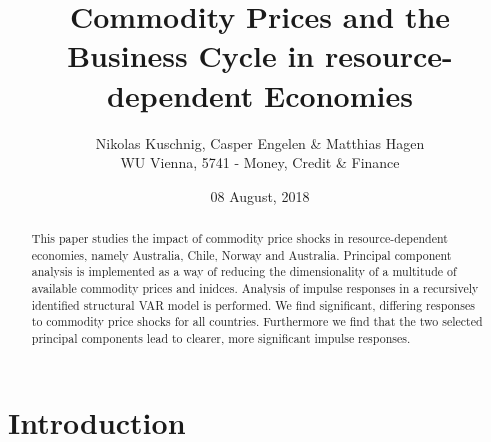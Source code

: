 \documentclass[12pt,]{article}
\title{Commodity Prices and the Business Cycle in resource-dependent Economies}
\author{Nikolas Kuschnig, Casper Engelen \& Matthias Hagen\\
WU Vienna, 5741 - Money, Credit \& Finance}
\date{08 August, 2018}
\begin{document}
\maketitle
\begin{abstract}
This paper studies the impact of commodity price shocks in
resource-dependent economies, namely Australia, Chile, Norway and
Australia. Principal component analysis is implemented as a way of
reducing the dimensionality of a multitude of available commodity prices
and inidces. Analysis of impulse responses in a recursively identified
structural VAR model is performed. We find significant, differing
responses to commodity price shocks for all countries. Furthermore we
find that the two selected principal components lead to clearer, more
significant impulse responses.
\end{abstract}

{
\setcounter{tocdepth}{3}
\tableofcontents
}
\newpage

\section{Introduction}\label{introduction}
\end{document}
